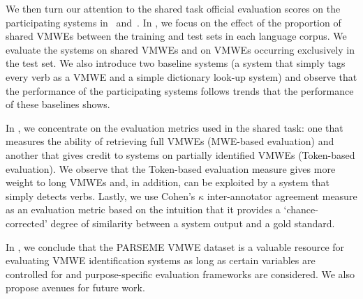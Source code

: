 \documentclass[output=paper
,modfonts
,nonflat,draftmode]{langsci/langscibook}
\begin{document}
We then turn our attention to the shared task official evaluation scores on the participating systems in ~and~. In , we focus on the effect of the proportion of shared VMWEs between the training and test sets in each language corpus. We evaluate the systems on shared VMWEs and on VMWEs occurring exclusively in the test set. We also introduce two baseline systems (a system that simply tags every verb as a VMWE and a simple dictionary look-up system) and observe that the performance of the participating systems follows trends that the performance of these baselines shows. 

In , we concentrate on the evaluation metrics used in the shared task: one that measures the ability of retrieving full VMWEs (MWE-based evaluation) and another that gives credit to systems on partially identified VMWEs (Token-based evaluation). We observe that the Token-based evaluation measure gives more weight to long VMWEs and, in addition, can be exploited by a system that simply detects verbs. Lastly, we use Cohen's $\kappa$ inter-annotator agreement measure as an evaluation metric based on the intuition that it provides a `chance-corrected' degree of similarity between a system output and a gold standard. 




In , we conclude that the PARSEME VMWE dataset is a valuable resource for evaluating VMWE identification systems as long as certain variables are controlled for and purpose-specific evaluation frameworks are considered. We also propose avenues for future work.
\end{document}
